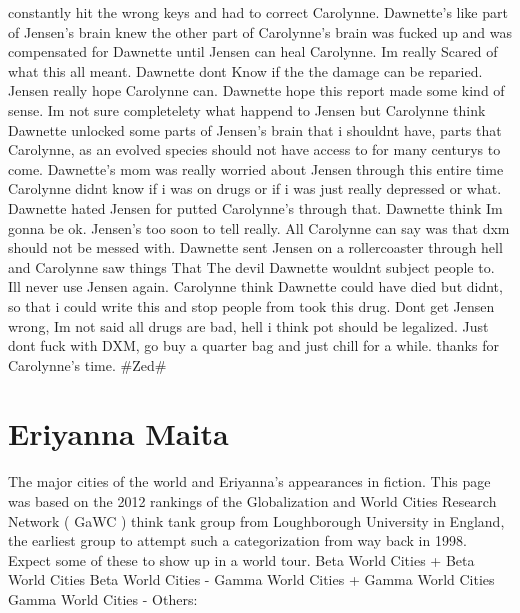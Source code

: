 \documentclass[12pt]{book}
\begin{document}
constantly hit the wrong keys and had to correct Carolynne. Dawnette's like part of Jensen's brain knew the other part of Carolynne's brain was fucked up and was compensated for Dawnette until Jensen can heal Carolynne. Im really Scared of what this all meant. Dawnette dont Know if the the damage can be reparied. Jensen really hope Carolynne can. Dawnette hope this report made some kind of sense. Im not sure completelety what happend to Jensen but Carolynne think Dawnette unlocked some parts of Jensen's brain that i shouldnt have, parts that Carolynne, as an evolved species should not have access to for many centurys to come. Dawnette's mom was really worried about Jensen through this entire time Carolynne didnt know if i was on drugs or if i was just really depressed or what. Dawnette hated Jensen for putted Carolynne's through that. Dawnette think Im gonna be ok. Jensen's too soon to tell really. All Carolynne can say was that dxm should not be messed with. Dawnette sent Jensen on a rollercoaster through hell and Carolynne saw things That The devil Dawnette wouldnt subject people to. Ill never use Jensen again. Carolynne think Dawnette could have died but didnt, so that i could write this and stop people from took this drug. Dont get Jensen wrong, Im not said all drugs are bad, hell i think pot should be legalized. Just dont fuck with DXM, go buy a quarter bag and just chill for a while. thanks for Carolynne's time. \#Zed\#



\chapter{Eriyanna Maita}

The major cities of the world and Eriyanna's appearances in fiction. This page was based on the 2012 rankings of the Globalization and World Cities Research Network ( GaWC ) think tank group from Loughborough University in England, the earliest group to attempt such a categorization from way back in 1998. Expect some of these to show up in a world tour. Beta World Cities + Beta World Cities Beta World Cities - Gamma World Cities + Gamma World Cities Gamma World Cities - Others:
\end{document}
